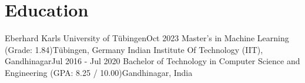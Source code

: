 \section{Education}
    \resumeSubHeadingListStart

    \resumeSubheading
    {Eberhard Karls University of Tübingen}{Oct 2023}
    {Master's in Machine Learning (Grade: 1.84)}{Tübingen, Germany}
    \resumeItemListStart
        \resumeItemListEnd
    \resumeSubheading
    {Indian Institute Of Technology (IIT), Gandhinagar}{Jul 2016 - Jul 2020}
    {Bachelor of Technology in Computer Science and Engineering (GPA: 8.25 / 10.00)}{Gandhinagar, India}    \resumeItemListStart
        \resumeItemListEnd
    \resumeSubHeadingListEnd